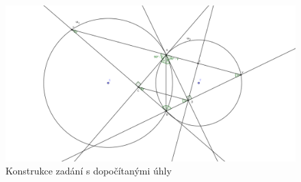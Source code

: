 \documentclass{fkssolpub}
\author{Ondřej Sedláček}
\begin{document}
 

\begin{figure}[h!]
  \centering
  \includegraphics{6-fig.png}
  \caption{Konstrukce zadání s dopočítanými úhly}
\end{figure}
\end{document}
